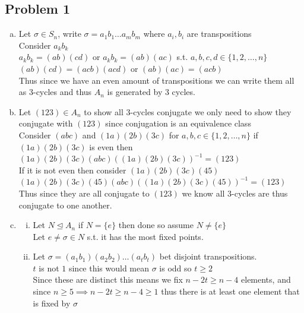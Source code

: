 \documentclass[12pt, letterpaper]{article}
\theoremstyle{definition}
\begin{document}
\pagestyle{fancy}
\fancyhf{}
\fancyhead[ROE]{\thepage}

\subsection*{Problem 1}
\begin{enumerate}[(a)]
    \item Let $\sigma \in S_n$, write $\sigma=a_1b_1\dots a_mb_m$ where $a_i,b_i$ are transpositions\\
    Consider $a_kb_k$\\
    $a_kb_k=(ab)(cd)$ or $a_kb_k=(ab)(ac)$ s.t. $a,b,c,d \in \{1,2,\dots, n\}$\\
    $(ab)(cd)=(acb)(acd)$ or $(ab)(ac)=(acb)$\\
    Thus since we have an even amount of transpositions we can write them all as 3-cycles and thus $A_n$ is generated by 3 cycles.
    \item Let $(123) \in A_n$ to show all 3-cycles conjugate we only need to show they conjugate with $(123)$ since conjugation is an equivalence class\\
    Consider $(abc)$ and $(1a)(2b)(3c)$ for $a,b,c \in \{1,2,\dots,n\}$ if $(1a)(2b)(3c)$ is even then\\
    $(1a)(2b)(3c)(abc)((1a)(2b)(3c))^{-1}=(123)$\\
    If it is not even then consider $(1a)(2b)(3c)(45)$\\
    $(1a)(2b)(3c)(45)(abc)((1a)(2b)(3c)(45))^{-1}=(123)$\\
    Thus since they are all conjugate to $(123)$ we know all 3-cycles are thus conjugate to one another.
    \item \begin{enumerate}[i.]
        \item Let $N \unlhd A_n$ if $N=\{e\}$ then done so assume $N \neq \{e\}$\\
        Let $e \neq \sigma \in N$ s.t. it has the most fixed points.
        \item Let $\sigma=(a_1b_1)(a_2b_2)\dots(a_tb_t)$ bet disjoint transpositions.\\
        $t$ is not $1$ since this would mean $\sigma$ is odd so $t\geq 2$\\
        Since these are distinct this means we fix $n-2t \geq n-4$ elements, and since $n \geq 5 \implies n-2t \geq n-4 \geq 1$ thus there is at least one element that is fixed by $\sigma$\\

\end{enumerate}
\end{enumerate}
\end{document}
